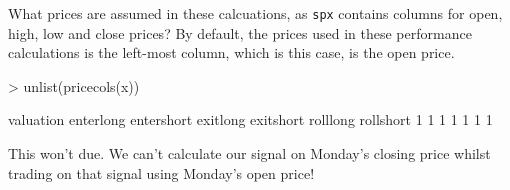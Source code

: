 \documentclass[a4]{article}
\newcommand{\code}[1]{\texttt{#1}}
\begin{document}
What prices are assumed in these calcuations, as \code{spx} contains
columns for open, high, low and close prices? By default, the prices
used in these performance calculations is the left-most column, which
is this case, is the open price. 
\begin{Schunk}
\begin{Sinput}
> unlist(pricecols(x))
\end{Sinput}
\begin{Soutput}
 valuation  enterlong entershort   exitlong  exitshort   rolllong  rollshort 
         1          1          1          1          1          1          1 
\end{Soutput}
\end{Schunk}
This won't due. We can't calculate our signal on Monday's closing
price whilst trading on that signal using Monday's open price!
\end{document}

